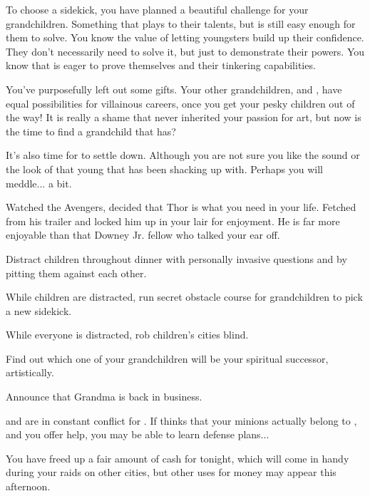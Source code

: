 \documentclass[char]{LRSguildcamp1}
\begin{document}
To choose a sidekick, you have planned a beautiful challenge for your grandchildren. Something that plays to their talents, but is still easy enough for them to solve. You know the value of letting youngsters build up their confidence. They don't necessarily need to solve it, but just to demonstrate their powers. You know that \cTeen{} is eager to prove themselves and their tinkering capabilities. 

You've purposefully left out some gifts. Your other grandchildren, \cGrad{} and \cTween{}, have equal possibilities for villainous careers, once you get your pesky children out of the way! It is really a shame that \cYoungest {} never inherited your passion for art, but now is the time to find a grandchild that has? 

It's also time for \cYoungest {} to settle down. Although you are not sure you like the sound or the look of that young \cYS{\hero} that \cYoungest{} has been shacking up with. Perhaps you will meddle... a bit. 

Watched the Avengers, decided that Thor is what you need in your life. Fetched \cChrisHemsworth{\intro} from his trailer and locked him up in your lair for enjoyment. He is far more enjoyable than that Downey Jr. fellow who talked your ear off. 

\begin{itemz}[Goals]
	\item Distract children throughout dinner with personally invasive questions and by pitting them against each other. 
	\item While children are distracted, run secret obstacle course for grandchildren to pick a new sidekick. 
	\item While everyone is distracted, rob children's cities blind. 
	\item Find out which one of your grandchildren will be your spiritual successor, artistically. 
	\item Announce that Grandma is back in business. 
	
\end{itemz}

\begin{itemz}[Notes]
	\item \cOldest{} and \cOS{} are in constant conflict for \pCityO{}.  If \cOldest{} thinks that your minions actually belong to \cOS{}, and you offer help, you may be able to learn \cOldest{\their} defense plans...
	\item You have freed up a fair amount of cash for tonight, which will come in handy during your raids on other cities, but other uses for money may appear this afternoon.
\end{itemz}
\end{document}
